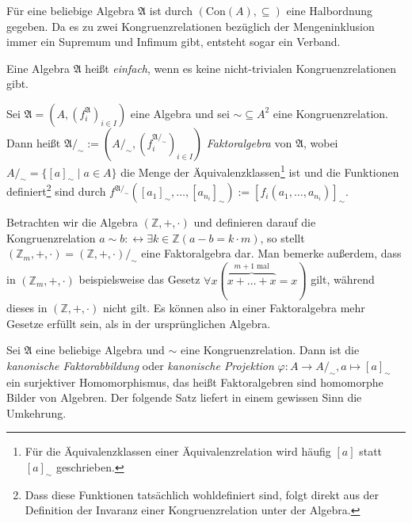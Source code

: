 \begin{remark}
    Für eine beliebige Algebra $\mathfrak{A}$ ist durch $(\text{Con}(A),\subseteq)$ eine Halbordnung gegeben.
    Da es zu zwei Kongruenzrelationen bezüglich der Mengeninklusion immer ein Supremum und Infimum gibt,
    entsteht sogar ein Verband.
\end{remark}

\begin{definition} \label{def:einfache-algebra}
    Eine Algebra $\mathfrak{A}$ heißt \emph{einfach}, wenn es keine nicht-trivialen Kongruenzrelationen gibt.
\end{definition}

\begin{definition}
    Sei $\mathfrak{A}=(A,(f^\mathfrak{A}_i)_{i\in I})$ eine Algebra und sei $\sim\subseteq A^2$ eine Kongruenzrelation.
    Dann heißt $\mathfrak{A}/_\sim:=(A/_\sim,(f^{\mathfrak{A}/_\sim}_i)_{i\in I})$ \emph{Faktoralgebra} von $\mathfrak{A}$,
    wobei $A/_\sim=\{[a]_\sim\mid a\in A\}$ die Menge der Äquivalenzklassen\footnote{Für die Äquivalenzklassen einer Äquivalenzrelation
    wird häufig $[a]$ statt $[a]_\sim$ geschrieben.} ist und die Funktionen definiert\footnote{Dass diese Funktionen tatsächlich wohldefiniert sind,
    folgt direkt aus der Definition der Invaranz einer Kongruenzrelation unter der Algebra.} sind durch
    $f^{\mathfrak{A}/_\sim}([a_1]_\sim,\ldots,[a_{n_i}]_\sim):=[f_i(a_1,\ldots,a_{n_i})]_\sim.$
\end{definition}

\begin{example}
    Betrachten wir die Algebra $(\mathbb{Z},+,\cdot)$ und definieren darauf die Kongruenzrelation
    $a\sim b:\leftrightarrow \exists k\in\mathbb{Z}(a-b=k\cdot m)$, so stellt $(\mathbb{Z}_m,+,\cdot)=(\mathbb{Z},+,\cdot)/_\sim$
    eine Faktoralgebra dar. Man bemerke außerdem, dass in $(\mathbb{Z}_m,+,\cdot)$ beispielsweise das Gesetz
    $\forall x(\overbrace{x +\ldots + x}^{m+1\;\text{mal}}=x)$ gilt, während dieses in $(\mathbb{Z},+,\cdot)$ nicht gilt. Es können also in einer Faktoralgebra mehr Gesetze erfüllt sein, als in der ursprünglichen Algebra.
\end{example}

\begin{remark}
    Sei $\mathfrak{A}$ eine beliebige Algebra und $\sim$ eine Kongruenzrelation. Dann ist die \emph{kanonische Faktorabbildung} oder \emph{kanonische Projektion}
    $\varphi:A\to A/_\sim, a\mapsto [a]_\sim$ ein surjektiver Homomorphismus, das heißt
    Faktoralgebren sind homomorphe Bilder von Algebren. Der folgende Satz liefert in einem gewissen Sinn die Umkehrung.
\end{remark}

